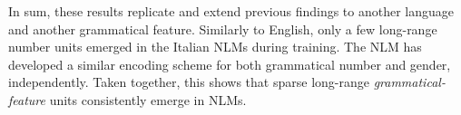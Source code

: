 \vspace{10pt}
In sum, these results replicate and extend previous findings to another language and another grammatical feature. Similarly to English, only a few long-range number units emerged in the Italian NLMs during training. The NLM has developed a similar encoding scheme for both grammatical number and gender, independently. Taken together, this shows that sparse long-range \textit{grammatical-feature} units consistently emerge in NLMs.



